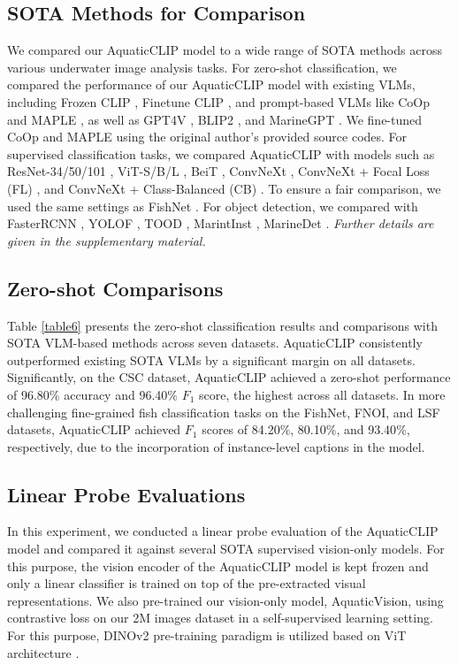 \subsection{SOTA Methods for Comparison}
We compared our AquaticCLIP model to a wide range of SOTA methods across various underwater image analysis tasks. 
For zero-shot classification, we compared the performance of our AquaticCLIP model with existing VLMs, including Frozen CLIP \cite{radford2021learning}, Finetune CLIP \cite{radford2021learning}, and prompt-based VLMs like CoOp \cite{zhou2022learning} and MAPLE \cite{khattak2023maple}, as well as GPT4V \cite{yang2023dawn}, BLIP2 \cite{li2023blip}, and MarineGPT \cite{zheng2023marinegpt}.
We fine-tuned CoOp and MAPLE using the original author's provided source codes. 
For supervised classification tasks, we compared AquaticCLIP with models such as ResNet-34/50/101 \cite{he2016deep}, ViT-S/B/L \cite{alexey2020image}, BeiT \cite{bao2021beit}, ConvNeXt \cite{liu2022convnet}, ConvNeXt \cite{liu2022convnet} + Focal Loss (FL) \cite{lin2017focal}, and ConvNeXt \cite{liu2022convnet} + Class-Balanced (CB) \cite{cui2019class}.
To ensure a fair comparison, we used the same settings as FishNet \cite{khan2023fishnet}. 
For object detection, we compared with FasterRCNN \cite{ren2016faster}, YOLOF \cite{chen2021you}, TOOD \cite{feng2021tood}, MarintInst \cite{ziqiang2024marineinst}, MarineDet \cite{haixin2023marinedet}.
\textit{Further details are given in the supplementary material.}
\subsection{Zero-shot Comparisons}
Table \ref{table6} presents the zero-shot classification results and comparisons with SOTA VLM-based methods across seven datasets. 
AquaticCLIP consistently outperformed existing SOTA VLMs by a significant margin on all datasets. 
Significantly, on the CSC dataset, AquaticCLIP achieved a zero-shot performance of 96.80$\%$ accuracy and 96.40$\%$ $F_{1}$ score, the highest across all datasets. 
In more challenging fine-grained fish classification tasks on the FishNet, FNOI, and LSF datasets, AquaticCLIP achieved $F_{1}$ scores of 84.20$\%$, 80.10$\%$, and 93.40$\%$, respectively, due to the incorporation of instance-level captions in the model.
\subsection{Linear Probe Evaluations}
In this experiment, we conducted a linear probe evaluation of the AquaticCLIP model and compared it against several SOTA supervised vision-only models.
For this purpose, the vision encoder of the AquaticCLIP model is kept frozen and only a linear classifier is trained on top of the pre-extracted visual representations.
We also pre-trained our vision-only model, AquaticVision, using contrastive loss on our 2M images dataset in a self-supervised learning setting. 
For this purpose, DINOv2 pre-training paradigm is utilized based on ViT architecture \cite{oquab2023dinov2}.

